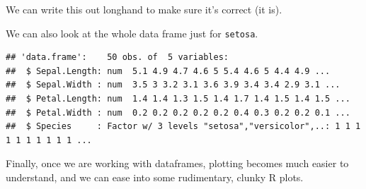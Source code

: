 \documentclass[
]{book}
\newenvironment{Shaded}{\begin{snugshade}}{\end{snugshade}}
\newcommand{\CommentTok}[1]{\textcolor[rgb]{0.56,0.35,0.01}{\textit{#1}}}
\newcommand{\KeywordTok}[1]{\textcolor[rgb]{0.13,0.29,0.53}{\textbf{#1}}}
\newcommand{\NormalTok}[1]{#1}
\newcommand{\OperatorTok}[1]{\textcolor[rgb]{0.81,0.36,0.00}{\textbf{#1}}}
\newcommand{\StringTok}[1]{\textcolor[rgb]{0.31,0.60,0.02}{#1}}
\begin{document}
We can write this out longhand to make sure it's correct (it is).

\begin{Shaded}
\end{Shaded}

We can also look at the whole data frame just for \texttt{setosa}.

\begin{Shaded}
\end{Shaded}

\begin{verbatim}
## 'data.frame':	50 obs. of  5 variables:
##  $ Sepal.Length: num  5.1 4.9 4.7 4.6 5 5.4 4.6 5 4.4 4.9 ...
##  $ Sepal.Width : num  3.5 3 3.2 3.1 3.6 3.9 3.4 3.4 2.9 3.1 ...
##  $ Petal.Length: num  1.4 1.4 1.3 1.5 1.4 1.7 1.4 1.5 1.4 1.5 ...
##  $ Petal.Width : num  0.2 0.2 0.2 0.2 0.2 0.4 0.3 0.2 0.2 0.1 ...
##  $ Species     : Factor w/ 3 levels "setosa","versicolor",..: 1 1 1 1 1 1 1 1 1 1 ...
\end{verbatim}

Finally, once we are working with dataframes, plotting becomes much easier to understand, and we can ease into some rudimentary, clunky R plots.

\begin{Shaded}
\end{Shaded}
\end{document}
